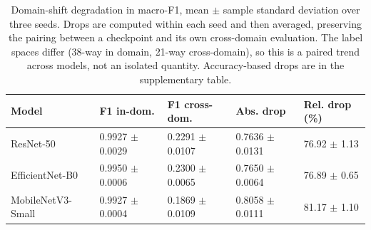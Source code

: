 \begin{table}[htbp]
\caption{Domain-shift degradation in macro-F1, mean $\pm$ sample standard deviation over three seeds. Drops are computed within each seed and then averaged, preserving the pairing between a checkpoint and its own cross-domain evaluation. The label spaces differ (38-way in domain, 21-way cross-domain), so this is a paired trend across models, not an isolated quantity. Accuracy-based drops are in the supplementary table.}
\label{tab:degradation-compact}
\scriptsize
\centering
\setlength{\tabcolsep}{5pt}
\begin{tabular}{lllll}
\toprule
Model & F1 in-dom. & F1 cross-dom. & Abs. drop & Rel. drop (\%) \\
\midrule
ResNet-50 & 0.9927 $\pm$ 0.0029 & 0.2291 $\pm$ 0.0107 & 0.7636 $\pm$ 0.0131 & 76.92 $\pm$ 1.13 \\
EfficientNet-B0 & 0.9950 $\pm$ 0.0006 & 0.2300 $\pm$ 0.0065 & 0.7650 $\pm$ 0.0064 & 76.89 $\pm$ 0.65 \\
MobileNetV3-Small & 0.9927 $\pm$ 0.0004 & 0.1869 $\pm$ 0.0109 & 0.8058 $\pm$ 0.0111 & 81.17 $\pm$ 1.10 \\
\bottomrule
\end{tabular}
\end{table}
